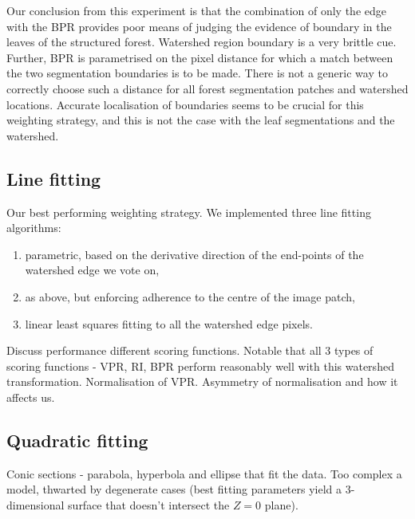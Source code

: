 Our conclusion from this experiment is that the combination of only the edge with the BPR provides poor means of judging the evidence of boundary in the leaves of the structured forest. Watershed region boundary is a very brittle cue. Further, BPR is parametrised on the pixel distance for which a match between the two segmentation boundaries is to be made. There is not a generic way to correctly choose such a distance for all forest segmentation patches and watershed locations. Accurate localisation of boundaries seems to be crucial for this weighting strategy, and this is not the case with the leaf segmentations and the watershed.

\subsection*{Line fitting}
Our best performing weighting strategy. We implemented three line fitting algorithms:
\begin{enumerate}
  \item parametric, based on the derivative direction of the end-points of the watershed edge we vote on,
  \item as above, but enforcing adherence to the centre of the image patch,
  \item linear least squares fitting to all the watershed edge pixels.
\end{enumerate}

Discuss performance \wrt different scoring functions. Notable that all 3 types of scoring functions - VPR, RI, BPR perform reasonably well with this watershed transformation. Normalisation of VPR. Asymmetry of normalisation and how it affects us.

\subsection*{Quadratic fitting} %
Conic sections - parabola, hyperbola and ellipse that fit the data. Too complex a model, thwarted by degenerate cases (best fitting parameters yield a 3-dimensional surface that doesn't intersect the $Z=0$ plane).



